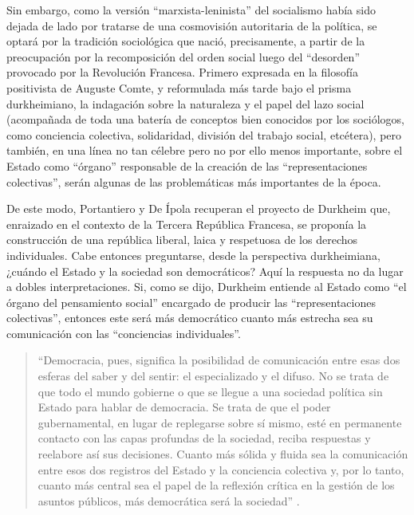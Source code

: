 {Sin embargo, como la versión \enquote{marxista-leninista} del socialismo había sido dejada de lado por tratarse de una cosmovisión autoritaria de la política, se optará por la tradición sociológica que nació, precisamente, a partir de la preocupación por la recomposición del orden social luego del \enquote{desorden} provocado por la Revolución Francesa. Primero expresada en la filosofía positivista de Auguste Comte, y reformulada más tarde bajo el prisma durkheimiano, la indagación sobre la naturaleza y el papel del lazo social (acompañada de toda una batería de conceptos bien conocidos por los sociólogos, como conciencia colectiva, solidaridad, división del trabajo social, etcétera), pero también, en una línea no tan célebre pero no por ello menos importante, sobre el Estado como \enquote{órgano} responsable de la creación de las \enquote{representaciones colectivas}, serán algunas de las problemáticas más importantes de la época.

De este modo, Portantiero y De Ípola recuperan el proyecto de Durkheim que, enraizado en el contexto de la Tercera República Francesa, se proponía la construcción de una república liberal, laica y respetuosa de los derechos individuales. Cabe entonces preguntarse, desde la perspectiva durkheimiana, ¿cuándo el Estado y la sociedad son democráticos? Aquí la respuesta no da lugar a dobles interpretaciones. Si, como se dijo, Durkheim entiende al Estado como \enquote{el órgano del pensamiento social} encargado de producir las \enquote{representaciones colectivas}, entonces este será más democrático cuanto más estrecha sea su comunicación con las \enquote{conciencias individuales}.

\begin{quote}
\enquote{Democracia, pues, significa la posibilidad de comunicación entre esas dos esferas del saber y del sentir: el especializado y el difuso. No se trata de que todo el mundo gobierne o que se llegue a una sociedad política sin Estado para hablar de democracia. Se trata de que el poder gubernamental, en lugar de replegarse sobre sí mismo, esté en permanente contacto con las capas profundas de la sociedad, reciba respuestas y reelabore así sus decisiones. Cuanto más sólida y fluida sea la comunicación entre esos dos registros del Estado y la conciencia colectiva y, por lo tanto, cuanto más central sea el papel de la reflexión crítica en la gestión de los asuntos públicos, más democrática será la sociedad} \parencite[19]{1540-PORTANTIERO1987}.
\end{quote}

}
